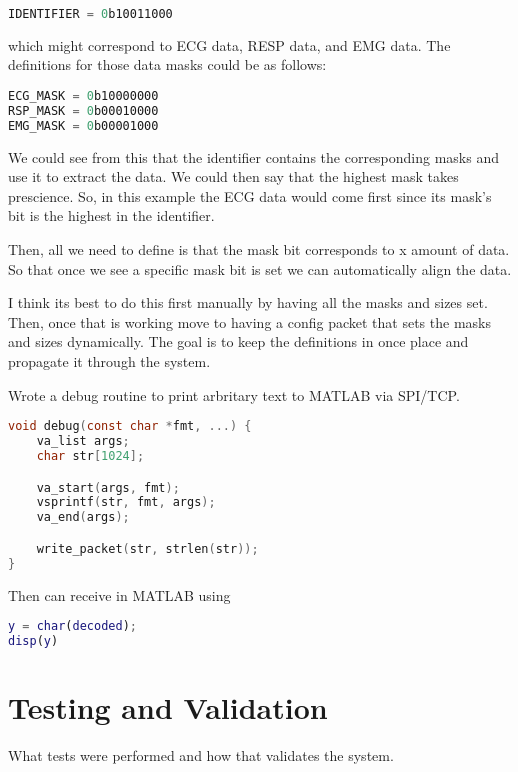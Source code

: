 \begin{lstlisting}[language=C]
IDENTIFIER = 0b10011000
\end{lstlisting}

which might correspond to ECG data, RESP data, and EMG data.
The definitions for those data masks could be as follows:

\begin{lstlisting}[language=C]
ECG_MASK = 0b10000000
RSP_MASK = 0b00010000
EMG_MASK = 0b00001000
\end{lstlisting}

We could see from this that the identifier contains the corresponding
masks and use it to extract the data.
We could then say that the highest mask takes prescience.
So, in this example the ECG data would come first since its mask's bit
is the highest in the identifier.

Then, all we need to define is that the mask bit corresponds to x amount
of data. So that once we see a specific mask bit is set we can
automatically align the data.

I think its best to do this first manually by having all the masks
and sizes set. Then, once that is working move to having a config packet
that sets the masks and sizes dynamically.
The goal is to keep the definitions in once place and propagate it
through the system.

Wrote a debug routine to print arbritary text to MATLAB via SPI/TCP.

\begin{lstlisting}[language=C]
void debug(const char *fmt, ...) {
    va_list args;
    char str[1024];

    va_start(args, fmt);
    vsprintf(str, fmt, args);
    va_end(args);

    write_packet(str, strlen(str));
}
\end{lstlisting}

Then can receive in MATLAB using

\begin{lstlisting}[language=MATLAB]
y = char(decoded);
disp(y)
\end{lstlisting}


\section{Testing and Validation}
What tests were performed and how that validates the system.
